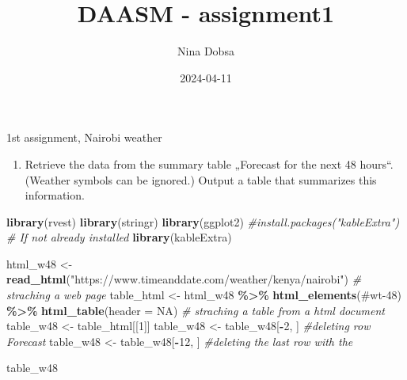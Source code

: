 \documentclass[
]{article}
\title{DAASM - assignment1}
\author{Nina Dobsa}
\date{2024-04-11}
\newenvironment{Shaded}{\begin{snugshade}}{\end{snugshade}}
\newcommand{\AttributeTok}[1]{\textcolor[rgb]{0.13,0.29,0.53}{#1}}
\newcommand{\CommentTok}[1]{\textcolor[rgb]{0.56,0.35,0.01}{\textit{#1}}}
\newcommand{\ConstantTok}[1]{\textcolor[rgb]{0.56,0.35,0.01}{#1}}
\newcommand{\DecValTok}[1]{\textcolor[rgb]{0.00,0.00,0.81}{#1}}
\newcommand{\FunctionTok}[1]{\textcolor[rgb]{0.13,0.29,0.53}{\textbf{#1}}}
\newcommand{\NormalTok}[1]{#1}
\newcommand{\OtherTok}[1]{\textcolor[rgb]{0.56,0.35,0.01}{#1}}
\newcommand{\SpecialCharTok}[1]{\textcolor[rgb]{0.81,0.36,0.00}{\textbf{#1}}}
\newcommand{\StringTok}[1]{\textcolor[rgb]{0.31,0.60,0.02}{#1}}
\providecommand{\tightlist}{%
  \setlength{\itemsep}{0pt}\setlength{\parskip}{0pt}}
\begin{document}
\maketitle

1st assignment, Nairobi weather

\begin{enumerate}
\def\labelenumi{\alph{enumi})}
\tightlist
\item
  Retrieve the data from the summary table „Forecast for the next 48
  hours``. (Weather symbols can be ignored.) Output a table that
  summarizes this information.
\end{enumerate}

\begin{Shaded}
\begin{Highlighting}[]
\FunctionTok{library}\NormalTok{(rvest)}
\FunctionTok{library}\NormalTok{(stringr)}
\FunctionTok{library}\NormalTok{(ggplot2)}
\CommentTok{\#install.packages("kableExtra")  \# If not already installed}
\FunctionTok{library}\NormalTok{(kableExtra)}
\end{Highlighting}
\end{Shaded}

\begin{Shaded}
\begin{Highlighting}[]
\NormalTok{html\_w48 }\OtherTok{\textless{}{-}} \FunctionTok{read\_html}\NormalTok{(}\StringTok{"https://www.timeanddate.com/weather/kenya/nairobi"}\NormalTok{) }\CommentTok{\# straching a web page}
\NormalTok{table\_html }\OtherTok{\textless{}{-}}\NormalTok{ html\_w48 }\SpecialCharTok{\%\textgreater{}\%} \FunctionTok{html\_elements}\NormalTok{(}\StringTok{\textquotesingle{}\#wt{-}48\textquotesingle{}}\NormalTok{) }\SpecialCharTok{\%\textgreater{}\%} \FunctionTok{html\_table}\NormalTok{(}\AttributeTok{header =} \ConstantTok{NA}\NormalTok{) }\CommentTok{\# straching a table from a html document}
\NormalTok{table\_w48 }\OtherTok{\textless{}{-}}\NormalTok{ table\_html[[}\DecValTok{1}\NormalTok{]]}
\NormalTok{table\_w48 }\OtherTok{\textless{}{-}}\NormalTok{ table\_w48[}\SpecialCharTok{{-}}\DecValTok{2}\NormalTok{, ] }\CommentTok{\#deleting row Forecast}
\NormalTok{table\_w48 }\OtherTok{\textless{}{-}}\NormalTok{ table\_w48[}\SpecialCharTok{{-}}\DecValTok{12}\NormalTok{, ] }\CommentTok{\#deleting the last row with the }

\NormalTok{table\_w48}
\end{Highlighting}
\end{Shaded}
\end{document}
